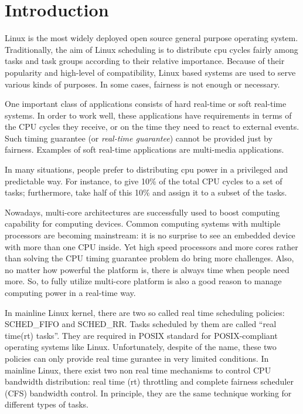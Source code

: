 \chapter{Introduction\label{chap:introduction}}

Linux is the most widely deployed open source general purpose
operating system. Traditionally, the aim of Linux scheduling is to
distribute cpu cycles fairly among tasks and task groups according to
their relative importance. Because of their popularity and high-level
of compatibility, Linux based systems are used to serve various kinds
of purposes. In some cases, fairness is not enough or necessary.

One important class of applications consists of hard real-time or soft
real-time systems. In order to work well, these applications have
requirements in terms of the CPU cycles they receive, or on the time
they need to react to external events. Such timing guarantee (or
\emph{real-time guarantee}) cannot be provided just by fairness.
Examples of soft real-time applications are multi-media applications.

%
In many situations, people prefer to distributing cpu power in a
privileged and predictable way. For instance, to give 10\% of the
total CPU cycles to a set of tasks; furthermore, take half of this
10\% and assign it to a subset of the tasks.

Nowadays, multi-core architectures are successfully used to boost
computing capability for computing devices. Common computing systems
with multiple processors are becoming mainstream: it is no surprise to
see an embedded device with more than one CPU inside.  Yet high speed
processors and more cores rather than solving the CPU timing guarantee
problem do bring more challenges. Also, no matter how powerful the
platform is, there is always time when people need more. So, to fully
utilize multi-core platform is also a good reason to manage computing
power in a real-time way.

In mainline Linux kernel, there are two so called real time scheduling 
policies: SCHED\_FIFO and SCHED\_RR. Tasks scheduled by them are called 
``real time(rt) tasks''. They are required in POSIX standard for 
POSIX-compliant operating systems like Linux. Unfortunately, despite of 
the name, these two policies can only provide real time gurantee in very 
limited conditions. In mainline Linux, there exist two non real time 
mechanisms to control CPU bandwidth distribution: real time (rt) throttling 
and complete fairness scheduler (CFS) bandwidth control. In principle, they 
are the same technique working for different types of tasks.


